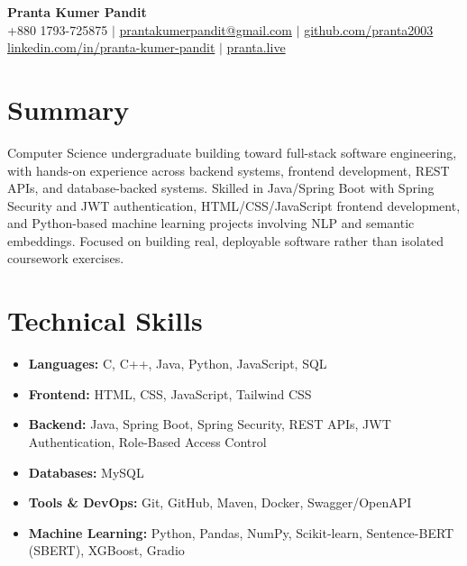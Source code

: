 \documentclass[letterpaper,11pt]{article}
\begin{document}
\begin{center}
    {\Huge \bfseries Pranta Kumer Pandit} \\ \vspace{7pt}
    \normalsize
    +880 1793-725875 \quad $|$ \quad
    \href{mailto:prantakumerpandit@gmail.com}{prantakumerpandit@gmail.com} \quad $|$ \quad
    \href{https://github.com/pranta2003}{github.com/pranta2003} \\ \vspace{4pt}
    \href{https://www.linkedin.com/in/pranta-kumer-pandit-997718383/}{linkedin.com/in/pranta-kumer-pandit} \quad $|$ \quad
    \href{https://pranta.live}{pranta.live}
\end{center}
\vspace{2pt}

\section{Summary}
Computer Science undergraduate building toward full-stack software engineering, with hands-on experience across backend systems, frontend development, REST APIs, and database-backed systems. Skilled in Java/Spring Boot with Spring Security and JWT authentication, HTML/CSS/JavaScript frontend development, and Python-based machine learning projects involving NLP and semantic embeddings. Focused on building real, deployable software rather than isolated coursework exercises.

\section{Technical Skills}
\begin{itemize}[leftmargin=0.0in, label={}, itemsep=5pt, topsep=2pt]
    \item{\textbf{Languages:} C, C++, Java, Python, JavaScript, SQL}
    \item{\textbf{Frontend:} HTML, CSS, JavaScript, Tailwind CSS}
    \item{\textbf{Backend:} Java, Spring Boot, Spring Security, REST APIs, JWT Authentication, Role-Based Access Control}
    \item{\textbf{Databases:} MySQL}
    \item{\textbf{Tools \& DevOps:} Git, GitHub, Maven, Docker, Swagger/OpenAPI}
    \item{\textbf{Machine Learning:} Python, Pandas, NumPy, Scikit-learn, Sentence-BERT (SBERT), XGBoost, Gradio}
\end{itemize}
\end{document}
